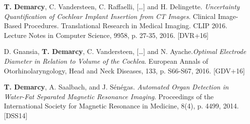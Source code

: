 \begin{cvhonors}

  \cvhonor
    {\textbf{T. Demarcy}, C. Vandersteen, C. Raffaelli, [\ldots] and H. Delingette. \textit{Uncertainty Quantification of Cochlear Implant Insertion from CT Images}. Clinical Image-Based Procedures. Translational Research in Medical Imaging. CLIP 2016. Lecture Notes in Computer Science, 9958, p. 27-35, 2016.} %
    {\hypertarget{DVR+16}{[DVR+16]}} %
    
  \cvhonor
    {D. Gnansia, \textbf{T. Demarcy},  C.  Vandersteen,  [\ldots]  and  N.  Ayache.\textit{Optimal  Electrode  Diameter  in  Relation  to  Volume  of  the  Cochlea}. European Annals of Otorhinolaryngology, Head and Neck Diseases, 133, p. S66-S67, 2016.} %
    {\hypertarget{GDV+16}{[GDV+16]}} %
    
  \cvhonor
    {\textbf{T. Demarcy}, A. Saalbach, and J. Sénégas. \textit{Automated Organ Detection in Water-Fat Separated Magnetic Resonance Imaging}. Proceedings of the International Society for Magnetic Resonance in Medicine, 8(4), p. 4499, 2014.} %
    {\hypertarget{DSS14}{[DSS14]}} %
    
\end{cvhonors}
\pagebreak


